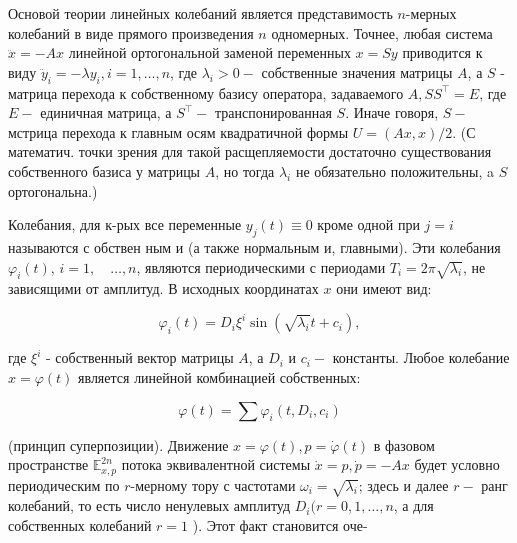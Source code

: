 \documentclass[10pt]{article}
\begin{document}
Основой теории линейных колебаний является представимость $n$-мерных колебаний в виде прямого произведения $n$ одномерных. Точнее, любая система $\ddot{x}=-A x$ линейной ортогональной заменой переменных $x=S y$ приводится к виду $\ddot{y}_{i}=-\lambda y_{i}, i=1, \ldots, n$, где $\lambda_{i}>0-$ собственные значения матрицы $A$, а $S$ - матрица перехода к собственному базису оператора, задаваемого $A, S S^{\top}=E$, где $E-$ единичная матрица, а $S^{\top}-$ транспонированная $S$. Иначе говоря, $S-$ мстрица перехода к главным осям квадратичной формы $U=(A x, x) / 2$. (С математич. точки зрения для такой расщепляемости достаточно существования собственного базиса у матрицы $A$, но тогда $\lambda_{i}$ не обязательно положительны, a $S$ ортогональна.)



Колебания, для к-рых все переменные $y_{j}(t) \equiv 0$ кроме одной при $j=i$ называются с обствен ным и (а также нормальным и, главными). Эти колебания $\varphi_{i}(t)$, $i=1, \quad \ldots, n$, являются периодическими с периодами $T_{i}=2 \pi \sqrt{\lambda_{i}}$, не зависящими от амплитуд. В исходных координатах $x$ они имеют вид:



\[

\varphi_{i}(t)=D_{i} \xi^{i} \sin \left(\sqrt{\lambda_{i}} t+c_{i}\right),

\]



где $\xi^{i}$ - собственный вектор матрицы $A$, а $D_{i}$ и $c_{i}-$ константы. Любое колебание $x=\varphi(t)$ является линейной комбинацией собственных:



\[

\varphi(t)=\sum \varphi_{i}\left(t, D_{i}, c_{i}\right)

\]



(принцип суперпозиции). Движение $x=\varphi(t), p=\dot{\varphi}(t)$ в фазовом пространстве $\mathbb{E}_{x, p}^{2 n}$ потока эквивалентной системы $\dot{x}=p, \dot{p}=-A x$ будет условно периодическим по $r$-мерному тору с частотами $\omega_{i}=\sqrt{\lambda_{i}}$; здесь и далее $r-$ ранг колебаний, то есть число ненулевых амплитуд $D_{i}(r=0,1, \ldots, n$, а для собственных колебаний $r=1$ ). Этот факт становится оче-
\end{document}
